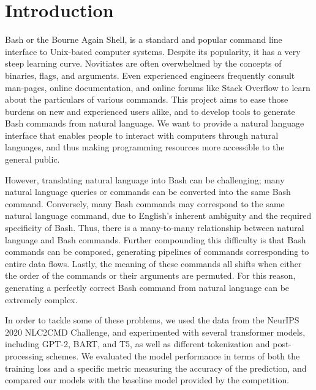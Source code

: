 \section{Introduction}
Bash or the Bourne Again Shell, is a standard and popular command line
interface to Unix-based computer systems. Despite its popularity, it has a
very steep learning curve. Novitiates are often overwhelmed by the concepts of
binaries, flags, and arguments. Even experienced engineers frequently consult
man-pages, online documentation, and online forums like Stack Overflow to learn
about the particulars of various commands. This project aims to ease those
burdens on new and experienced users alike, and to develop tools to generate Bash
commands from natural language. We want to provide a natural language
interface that enables people to interact with computers through natural
languages, and thus making programming resources more accessible to the
general public.
\par
However, translating natural language into Bash can be challenging; many
natural language queries or commands can be converted into the same Bash
command. Conversely, many Bash commands may correspond to the same natural
language command, due to English's inherent ambiguity and the required specificity
of Bash. Thus, there is a many-to-many relationship between natural
language and Bash commands. Further compounding this difficulty is that Bash
commands can be composed, generating pipelines of commands corresponding to
entire data flows. Lastly, the meaning of these commands all shifts when
either the order of the commands or their arguments are permuted. For this
reason, generating a perfectly correct Bash command from natural language can
be extremely complex.
\par
In order to tackle some of these problems, we used the data from the NeurIPS
2020 NLC2CMD Challenge, and experimented with several transformer models,
including GPT-2, BART, and T5, as well as different tokenization and
post-processing schemes. We evaluated the model performance in terms of both
the training loss and a specific metric measuring the accuracy of the
prediction, and compared our models with the baseline model provided by the
competition.

